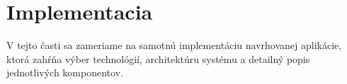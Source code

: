 \section{Implementacia}
V tejto časti sa zameriame na samotnú implementáciu navrhovanej aplikácie, ktorá zahŕňa výber technológií, architektúru systému a detailný popis jednotlivých komponentov.












